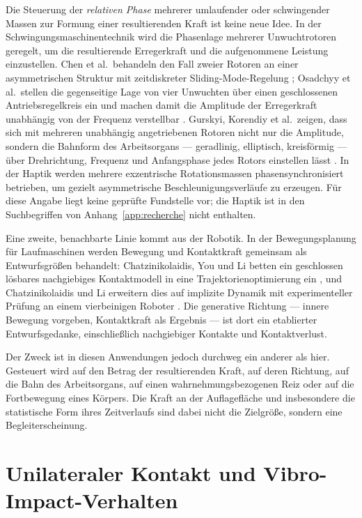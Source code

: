 \documentclass[12pt,a4paper]{report}
\begin{document}
Die Steuerung der \emph{relativen Phase} mehrerer umlaufender oder
schwingender Massen zur Formung einer resultierenden Kraft ist keine neue
Idee. In der Schwingungsmaschinentechnik wird die Phasenlage mehrerer
Unwuchtrotoren geregelt, um die resultierende Erregerkraft und die
aufgenommene Leistung einzustellen. Chen et al.\ behandeln den Fall
zweier Rotoren an einer asymmetrischen Struktur mit zeitdiskreter
Sliding-Mode-Regelung \cite{chen2019}; Osadchyy et al.\ stellen die
gegenseitige Lage von vier Unwuchten über einen geschlossenen
Antriebsregelkreis ein und machen damit die Amplitude der Erregerkraft
unabhängig von der Frequenz verstellbar \cite{osadchyy2023}. Gurskyi,
Korendiy et al.\ zeigen, dass sich mit mehreren unabhängig
angetriebenen Rotoren nicht nur die Amplitude, sondern die Bahnform
des Arbeitsorgans --- geradlinig, elliptisch, kreisförmig --- über
Drehrichtung, Frequenz und Anfangsphase jedes Rotors einstellen lässt
\cite{gurskyi2023}. In der Haptik werden mehrere exzentrische
Rotationsmassen phasensynchronisiert betrieben, um gezielt
asymmetrische Beschleunigungsverläufe zu erzeugen. Für diese Angabe
liegt keine geprüfte Fundstelle vor; die Haptik ist in den Suchbegriffen
von Anhang~\ref{app:recherche} nicht enthalten.

Eine zweite, benachbarte Linie kommt aus der Robotik. In der
Bewegungsplanung für Laufmaschinen werden Bewegung und Kontaktkraft
gemeinsam als Entwurfsgrößen behandelt: Chatzinikolaidis, You und Li
betten ein geschlossen lösbares nachgiebiges Kontaktmodell in eine
Trajektorienoptimierung ein \cite{chatzinikolaidis2020}, und
Chatzinikolaidis und Li erweitern dies auf implizite Dynamik mit
experimenteller Prüfung an einem vierbeinigen Roboter
\cite{chatzinikolaidis2021}. Die generative Richtung --- innere
Bewegung vorgeben, Kontaktkraft als Ergebnis --- ist dort ein
etablierter Entwurfsgedanke, einschließlich nachgiebiger Kontakte und
Kontaktverlust.

Der Zweck ist in diesen Anwendungen jedoch durchweg ein anderer als hier.
Gesteuert wird auf den Betrag der resultierenden Kraft, auf deren
Richtung, auf die Bahn des Arbeitsorgans, auf einen
wahrnehmungsbezogenen Reiz oder auf die Fortbewegung eines Körpers. Die Kraft an der
Auflagefläche und insbesondere die statistische Form ihres Zeitverlaufs
sind dabei nicht die Zielgröße, sondern eine Begleiterscheinung.

\section{Unilateraler Kontakt und Vibro-Impact-Verhalten}
\label{sec:stand-kontakt}
\end{document}
